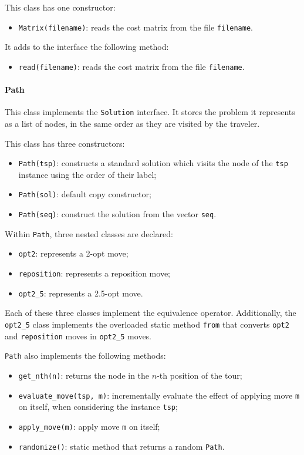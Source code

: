 \documentclass{article}
\begin{document}
This class has one constructor:
\begin{itemize}
    \item \texttt{Matrix(filename)}: reads the cost matrix from the file \texttt{filename}.
\end{itemize}

It adds to the interface the following method:
\begin{itemize}
    \item \texttt{read(filename)}: reads the cost matrix from the file \texttt{filename}.
\end{itemize}

\paragraph{Path}
This class implements the \texttt{Solution} interface.
It stores the problem it represents as a list of nodes, in the same order as they are visited by the traveler.

This class has three constructors:
\begin{itemize}
    \item \texttt{Path(tsp)}: constructs a standard solution which visits the node of the \texttt{tsp} instance using the order of their label;
    \item \texttt{Path(sol)}: default copy constructor;
    \item \texttt{Path(seq)}: construct the solution from the vector \texttt{seq}.
\end{itemize}

Within \texttt{Path}, three nested classes are declared:
\begin{itemize}
    \item \texttt{opt2}: represents a 2-opt move;
    \item \texttt{reposition}: represents a reposition move;
    \item \texttt{opt2\_5}: represents a 2.5-opt move.
\end{itemize}

Each of these three classes implement the equivalence operator.
Additionally, the \texttt{opt2\_5} class implements the overloaded static method \texttt{from} that converts \texttt{opt2} and \texttt{reposition} moves in \texttt{opt2\_5} moves.

\texttt{Path} also implements the following methods:
\begin{itemize}
    \item \texttt{get\_nth(n)}: returns the node in the $n$-th position of the tour;
    \item \texttt{evaluate\_move(tsp, m)}: incrementally evaluate the effect of applying move \texttt{m} on itself, when considering the instance \texttt{tsp};
    \item \texttt{apply\_move(m)}: apply move \texttt{m} on itself;
    \item \texttt{randomize()}: static method that returns a random \texttt{Path}.
\end{itemize}
\end{document}

